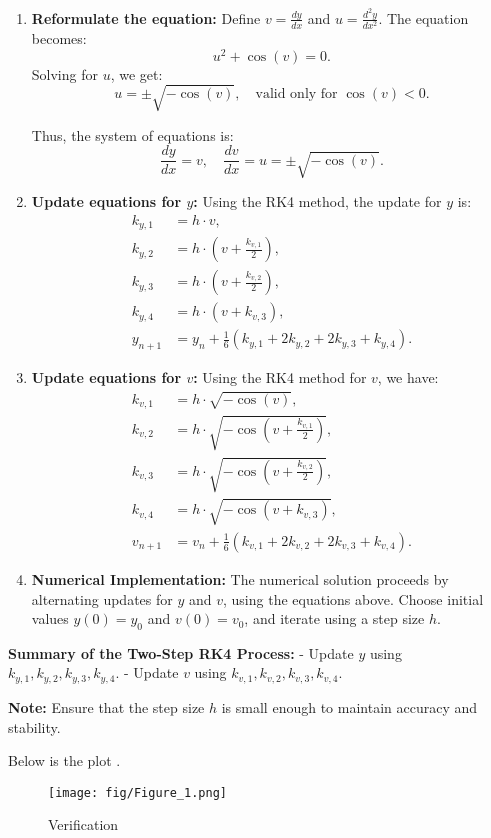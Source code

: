 \documentclass[journal]{IEEEtran}
\begin{document}
\begin{enumerate}
    \item \textbf{Reformulate the equation:}
    Define \(v = \frac{dy}{dx}\) and \(u = \frac{d^2y}{dx^2}\). The equation becomes:
    \[
    u^2 + \cos(v) = 0.
    \]
    Solving for \(u\), we get:
    \[
    u = \pm \sqrt{-\cos(v)}, \quad \text{valid only for } \cos(v) < 0.
    \]

    Thus, the system of equations is:
    \[
    \frac{dy}{dx} = v, \quad \frac{dv}{dx} = u = \pm \sqrt{-\cos(v)}.
    \]

    \item \textbf{Update equations for \(y\):}
    Using the RK4 method, the update for \(y\) is:
    \begin{align*}
        k_{y,1} &= h \cdot v, \\
        k_{y,2} &= h \cdot \left(v + \frac{k_{v,1}}{2}\right), \\
        k_{y,3} &= h \cdot \left(v + \frac{k_{v,2}}{2}\right), \\
        k_{y,4} &= h \cdot \left(v + k_{v,3}\right), \\
        y_{n+1} &= y_n + \frac{1}{6}\left(k_{y,1} + 2k_{y,2} + 2k_{y,3} + k_{y,4}\right).
    \end{align*}

    \item \textbf{Update equations for \(v\):}
    Using the RK4 method for \(v\), we have:
    \begin{align*}
        k_{v,1} &= h \cdot \sqrt{-\cos(v)}, \\
        k_{v,2} &= h \cdot \sqrt{-\cos\left(v + \frac{k_{v,1}}{2}\right)}, \\
        k_{v,3} &= h \cdot \sqrt{-\cos\left(v + \frac{k_{v,2}}{2}\right)}, \\
        k_{v,4} &= h \cdot \sqrt{-\cos\left(v + k_{v,3}\right)}, \\
        v_{n+1} &= v_n + \frac{1}{6}\left(k_{v,1} + 2k_{v,2} + 2k_{v,3} + k_{v,4}\right).
    \end{align*}

    \item \textbf{Numerical Implementation:}
    The numerical solution proceeds by alternating updates for \(y\) and \(v\), using the equations above. Choose initial values \(y(0) = y_0\) and \(v(0) = v_0\), and iterate using a step size \(h\).
\end{enumerate}

\textbf{Summary of the Two-Step RK4 Process:}
- Update \(y\) using \(k_{y,1}, k_{y,2}, k_{y,3}, k_{y,4}\).
- Update \(v\) using \(k_{v,1}, k_{v,2}, k_{v,3}, k_{v,4}\).

\textbf{Note:} Ensure that the step size \(h\) is small enough to maintain accuracy and stability.

Below is the plot .

\begin{figure}[h]
    \centering
    \texttt{[image: fig/Figure\_1.png]}
    \caption{Verification}
    \label{fig:example}
\end{figure}
\end{document}

